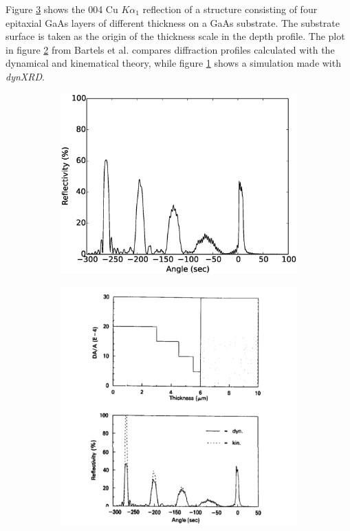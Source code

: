 \documentclass[12pt,oneside,notitlepage,abstracton,a4paper]{scrartcl}
\begin{document}
Figure \ref{GaAs_both} shows the 004 Cu $K\alpha_1$ reflection of a structure consisting of four epitaxial GaAs layers of different thickness on a GaAs substrate. The substrate surface is taken as the origin of the thickness scale in the depth profile. The plot in figure \ref{GaAs_article} from Bartels et al. \cite{Bartels:a25435} compares diffraction profiles calculated with the dynamical and kinematical theory, while figure \ref{GaAs} shows a simulation made with \textit{dynXRD}.
\begin{figure}[h]
 \centering
 \begin{subfigure}[h]{0.49\textwidth}
  \includegraphics[width=\textwidth]{pics/GaAs.eps}
  \caption{}
  \label{GaAs}
 \end{subfigure}
 \begin{subfigure}[h]{0.49\textwidth}
  \includegraphics[width=\textwidth]{pics/GaAs.png}
  \caption{}
  \label{GaAs_article}
 \end{subfigure}
 \caption{}\label{GaAs_both}
\end{figure}
\end{document}
